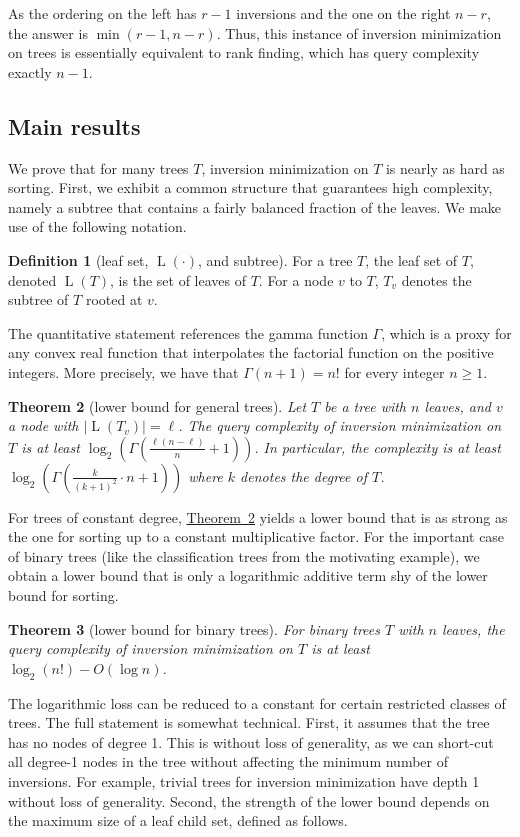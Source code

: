 \documentclass[11pt]{article}
\numberwithin{equation}{section}
\newtheorem{theorem}{Theorem}[section]
\theoremstyle{definition}
\newtheorem{definition}[theorem]{Definition}
\theoremstyle{plain}
\newcommand{\expref}[2]{\hyperref[#2]{#1~\ref{#2}}}
\DeclareMathOperator{\leafset}{L}
\begin{document}
As the ordering on the left has $r-1$ inversions and the one on the right $n-r$, the answer is $\min(r-1,n-r)$. Thus, this instance of inversion minimization on trees is essentially equivalent to rank finding, which has query complexity exactly $n-1$.

\subsection{Main results} 
%
We prove that for many trees $T$, inversion minimization on $T$ is nearly as hard as sorting. First, we exhibit a common structure that guarantees high complexity, namely a subtree that contains a fairly balanced fraction of the leaves. We make use of the following notation.
\begin{definition}[leaf set, $\leafset(\cdot)$, and subtree]
For a tree $T$, the leaf set of $T$, denoted $\leafset(T)$, is the set of leaves of $T$. For a node $v$ to $T$, $T_v$ denotes the subtree of $T$ rooted at $v$.
\end{definition}
The quantitative statement references the gamma function $\Gamma$, which is a proxy for any convex real function that interpolates the factorial function on the positive integers.  More precisely, %
we have that $\Gamma(n+1) = n!$ for every integer $n \ge 1$.
%
\begin{theorem}[lower bound for general trees]\label{thm:main:general}
Let $T$ be a tree with $n$ leaves, and $v$ a node with $\lvert\leafset(T_v)\rvert = \ell$. The query complexity of inversion minimization on $T$ is at least $\log_2(\Gamma( \frac{\ell(n-\ell)}{n}+1 ))$. In particular, the complexity is at least $\log_2(\Gamma(\frac{k}{(k+1)^2} \cdot n+1))$ where $k$ denotes the degree of $T$.
\end{theorem}
For trees of constant degree, \expref{Theorem}{thm:main:general} yields a lower bound that is as strong as the one for sorting up to a constant multiplicative factor. For the important case of binary trees (like the classification trees from the motivating example), we obtain a lower bound that is only a logarithmic additive term shy of the lower bound for sorting.
\begin{theorem}[lower bound for binary trees]\label{thm:main:binary}
For binary trees $T$ with $n$ leaves, the query complexity of inversion minimization on $T$ is at least $\log_2(n!) - O(\log n)$.
\end{theorem}
The logarithmic loss can be reduced to a constant for certain restricted classes of trees. The full statement is somewhat technical. First, it assumes that the tree has no nodes of degree 1. This is without loss of generality, as we can short-cut all degree-1 nodes in the tree without affecting the minimum number of inversions. For example, trivial trees for inversion minimization have depth 1 without loss of generality. Second, the strength of the lower bound depends on the maximum size of a leaf child set, defined as follows.
\end{document}
